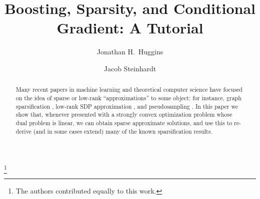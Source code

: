 \documentclass[reqno,oneside,a4paper]{amsart}
\begin{document}
 

\title{Boosting, Sparsity, and Conditional Gradient: A Tutorial}
	   
\thanks{The authors contributed equally to this work.}

\author[J.~H.~Huggins]{Jonathan H.~Huggins}
\address{Massachusetts Institute of Technology}

\author[J.~Steinhardt]{Jacob Steinhardt}
\address{Stanford University}


\begin{abstract} 
Many recent papers in machine learning and theoretical computer science have 
focused on the idea of sparse or low-rank ``approximations'' to some object: 
for instance, graph sparsification \cite{?}, low-rank SDP approximation \cite{?}, 
and pseudosampling \cite{?}. In this paper we show that, whenever presented with 
a strongly convex optimization problem whose dual problem is linear, we can obtain 
sparse approximate solutions, and use this to re-derive (and in some cases 
extend) many of the known sparsification results.
\end{abstract} 

\maketitle










\end{document}
